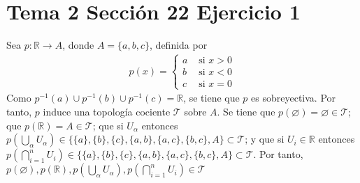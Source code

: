 \documentclass{article}
\begin{document}
\section{Tema 2 Sección 22 Ejercicio 1}
Sea $p:\mathbb{R}\rightarrow A$, donde $A=\{a,b,c\}$, definida por
\begin{eqnarray}
p(x)=\begin{cases}
a & \text{ si }x>0\nonumber\\
b & \text{ si }x<0\nonumber\\
c & \text{ si }x=0\nonumber
\end{cases}
\end{eqnarray}
Como $p^{-1}(a)\cup p^{-1}(b)\cup p^{-1}(c)=\mathbb{R}$, se tiene que $p$ es sobreyectiva. Por tanto, $p$ induce una topología  cociente $\mathcal{T}$ sobre $A$. Se tiene que $p(\varnothing)=\varnothing\in \mathcal{T}$; que $p(\mathbb{R})=A\in \mathcal{T}$;
que si $U_\alpha$ entonces $p(\bigcup_\alpha U_\alpha)\in\{\{a\},\{b\},\{c\},\{a,b\},\{a,c\},\{b,c\},A\}\subset\mathcal{T}$; y que si $U_i\in \mathbb{R}$ entonces $p(\bigcap_{i=1}^n U_i)\in\{\{a\},\{b\},\{c\},\{a,b\},\{a,c\},\{b,c\},A\}\subset \mathcal{T}$. Por tanto, $p(\varnothing),p(\mathbb{R}),p(\bigcup_\alpha U_\alpha),p(\bigcap_{i=1}^nU_i)\in \mathcal{T}$
\end{document}
